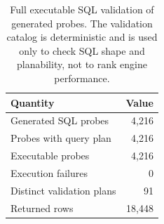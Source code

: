 \begin{table}[t]
\centering
\caption{Full executable SQL validation of generated probes. The validation catalog is deterministic and is used only to check SQL shape and planability, not to rank engine performance.}
\label{tab:sql-execution}
\small
\begin{tabular}{lr}
\toprule
Quantity & Value \\
\midrule
Generated SQL probes & 4,216 \\
Probes with query plan & 4,216 \\
Executable probes & 4,216 \\
Execution failures & 0 \\
Distinct validation plans & 91 \\
Returned rows & 18,448 \\
\bottomrule
\end{tabular}
\end{table}
